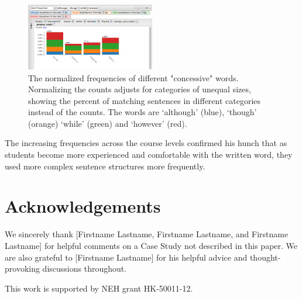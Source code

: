 \documentclass{sig-alternate}
\begin{document}
\begin{figure}[h!]
\includegraphics[width=0.5\textwidth]{fig/rex/05.png}
\caption{The normalized frequencies of different "concessive" words. Normalizing the counts adjusts for categories of unequal sizes, showing the percent of matching sentences in different categories instead of the counts. The words are `although' (blue), `though' (orange) `while' (green) and `however' (red). \label{fig:rex05}}
\end{figure}

The increasing frequencies across the course levels confirmed his hunch that as students become more experienced and comfortable with the written word, they used more complex sentence structures more frequently. 





\section{Acknowledgements}
We sincerely thank [Firstname Lastname, Firstname Lastname, and Firstname Lastname] for helpful comments on a Case Study not described in this paper. We are also grateful to [Firstname Lastname] for his helpful advice and thought-provoking discussions throughout.

This work is supported by NEH grant HK-50011-12.


 
  
\end{document}
